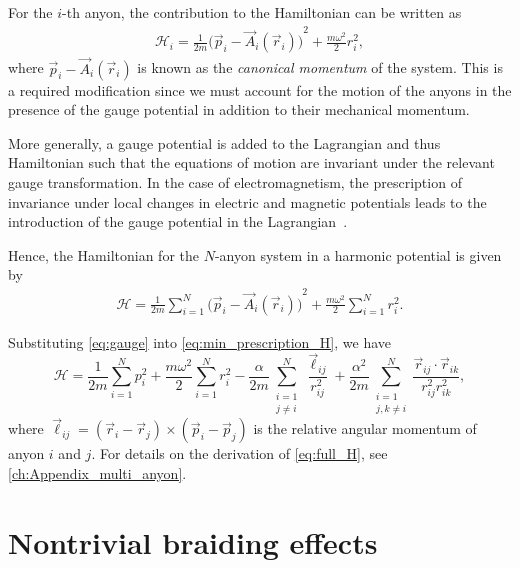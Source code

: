 
For the $i$-th anyon, the contribution to the Hamiltonian can be written as
\begin{align}
    \mathcal{H}_i = \frac{1}{2m}{\bigl(\vec{p}_i - \vec{A}_i(\vec{r}_i)\bigr)}^2 + \frac{m\omega^2}{2}{r}_i^{2},
\end{align}
where $\vec{p}_i - \vec{A}_i(\vec{r}_i)$ is known as the \textit{canonical momentum} of the system. This is a required modification since we must account for the motion of the anyons in the presence of the gauge potential in addition to their mechanical momentum.

More generally, a gauge potential is added to the Lagrangian and thus Hamiltonian such that the equations of motion are invariant under the relevant gauge transformation. In the case of electromagnetism, the prescription of invariance under local changes in electric and magnetic potentials leads to the introduction of the gauge potential in the Lagrangian~\cite{Griffiths2018,Moriyasu1983,Griffiths2017}.

Hence, the Hamiltonian for the $N$-anyon system in a harmonic potential is given by
\begin{align}
    \mathcal{H} = \frac{1}{2m} \sum_{i=1}^{N}{\bigl(\vec{p}_i - \vec{A}_i(\vec{r}_i)\bigr)}^2 + \frac{m\omega^2}{2}\sum_{i=1}^{N}{r}_i^{2}. \label{eq:min_prescription_H}
\end{align}

Substituting \cref{eq:gauge} into \cref{eq:min_prescription_H}, we have
\begin{equation}
    \mathcal{H} = \frac{1}{2m}\sum_{i=1}^{N}{p}_i^{2} + \frac{m\omega^2}{2}\sum_{i=1}^{N}{r}_i^{2} - \frac{\alpha}{2m}\sum_{\substack{i=1\\j\neq i}}^{N}\frac{\vec{\ell}_{ij}}{r_{ij}^2} + \frac{\alpha^2}{2m}\sum_{\substack{i=1\\j,k\neq i}}^{N}\frac{\vec{r}_{ij}\cdot\vec{r}_{ik}}{r_{ij}^2r_{ik}^2},\label{eq:full_H}
\end{equation}
where $\vec{\ell}_{ij} = (\vec{r}_i-\vec{r}_j)\times(\vec{p}_i-\vec{p}_j)$ is the relative angular momentum of anyon $i$ and $j$. For details on the derivation of \cref{eq:full_H}, see \cref{ch:Appendix_multi_anyon}.

\section{Nontrivial braiding effects}

